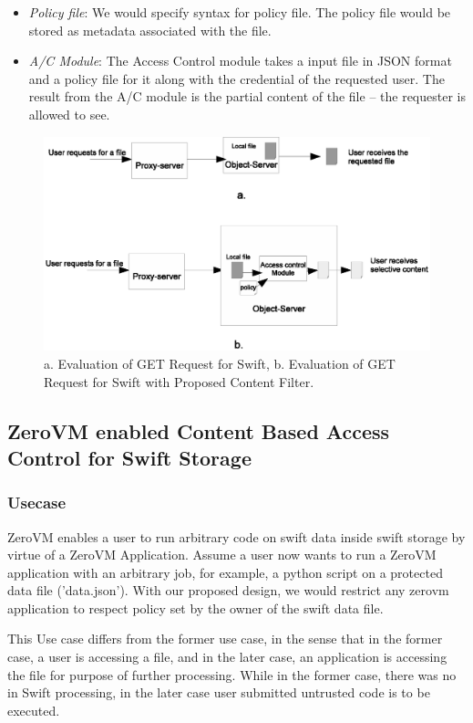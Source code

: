 \begin{appendices}
\begin{itemize}
\item \emph{Policy file}: We would specify syntax for policy file. The policy file would be stored as metadata associated with the file.
\item \emph{A/C Module}: The Access Control module takes a input file in JSON format and a policy file for it along with the credential of the requested user. The result from the A/C module is the partial content of the file – the requester is allowed to see.

\end{itemize}

\begin{figure}[t]
\centering
\includegraphics {eps/swift-content-filter}
\caption{a. Evaluation of GET Request for Swift, b.   Evaluation of GET Request for  Swift with Proposed Content Filter.}
\label{fig:swift-content-filter}
\end{figure}

\subsection{ ZeroVM enabled Content Based Access Control for Swift Storage} 

\subsubsection{ Usecase}
ZeroVM enables a user to run arbitrary code on swift data inside swift storage by virtue of a ZeroVM Application. Assume a user now wants to run a ZeroVM application with an  arbitrary job, for example, a python script on a protected data file ('data.json'). With our proposed design, we would restrict any zerovm application to respect policy set by the owner of the swift data file.

This Use case differs from the former use case, in the sense that in the former case, a user is accessing a file, and in the later case, an application is accessing the file for purpose of further processing. While in the former case, there was no in Swift processing, in the later case user submitted untrusted code is to be executed. 


\end{appendices}
